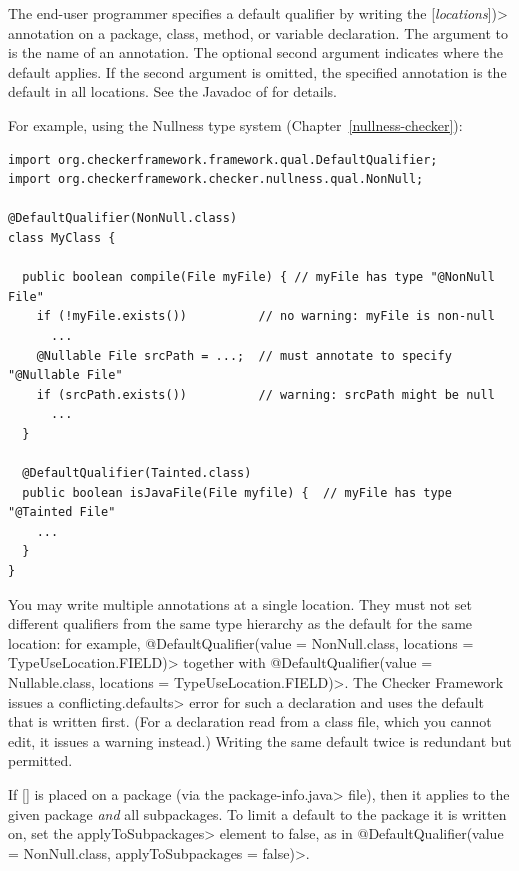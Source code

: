 The end-user programmer specifies a default qualifier by writing the
[\emph{locations}]\<)>
annotation on a package, class, method, or variable declaration.  The
argument to  is the 
name of an annotation.
The optional second argument indicates where the default
applies.  If the second argument is omitted, the specified annotation is
the default in all locations.  See the Javadoc of  for details.

For example, using the Nullness type system (Chapter~\ref{nullness-checker}):

\begin{Verbatim}
import org.checkerframework.framework.qual.DefaultQualifier;
import org.checkerframework.checker.nullness.qual.NonNull;

@DefaultQualifier(NonNull.class)
class MyClass {

  public boolean compile(File myFile) { // myFile has type "@NonNull File"
    if (!myFile.exists())          // no warning: myFile is non-null
      ...
    @Nullable File srcPath = ...;  // must annotate to specify "@Nullable File"
    if (srcPath.exists())          // warning: srcPath might be null
      ...
  }

  @DefaultQualifier(Tainted.class)
  public boolean isJavaFile(File myfile) {  // myFile has type "@Tainted File"
    ...
  }
}
\end{Verbatim}

You may write multiple
 annotations at a single location.
They must not set different qualifiers from the same type hierarchy as the
default for the same location:  for example,
\<@DefaultQualifier(value = NonNull.class, locations = TypeUseLocation.FIELD)>
together with
\<@DefaultQualifier(value = Nullable.class, locations = TypeUseLocation.FIELD)>.
The Checker Framework issues a \<conflicting.defaults> error for such a
declaration and uses the default that is written first.  (For a declaration
read from a class file, which you cannot edit, it issues a warning instead.)
Writing the same default twice is redundant but permitted.

If [] is placed on a package (via the
\<package-info.java> file), then it applies to the given package \emph{and}
all subpackages.  To limit a default to the package it is written on, set
the \<applyToSubpackages> element to false, as in
\<@DefaultQualifier(value = NonNull.class, applyToSubpackages = false)>.

